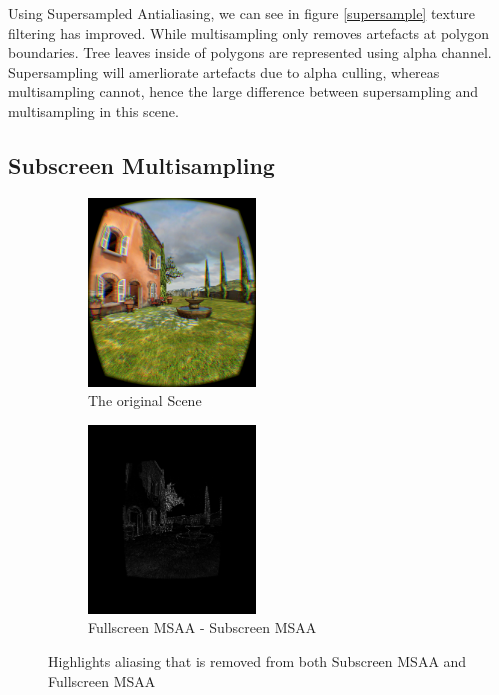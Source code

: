\documentclass[12pt,a4paper,twoside,openright]{report}
\begin{document}
Using Supersampled Antialiasing, we can see in figure \ref{supersample} texture filtering has improved. While multisampling only removes artefacts at polygon boundaries. Tree leaves inside of polygons are represented using alpha channel. Supersampling will amerliorate artefacts due to alpha culling, whereas multisampling cannot, hence the large difference between supersampling and multisampling in this scene.

\clearpage

\subsection{Subscreen Multisampling}

\begin{figure}[tbh]

\begin{subfigure}{0.5\textwidth}
\includegraphics[width=0.9\linewidth, height=5cm]{figs/noantialiasing.png}
\caption{The original Scene}
\label{fig:subim2}
\end{subfigure}
\begin{subfigure}{0.5\textwidth}
\includegraphics[width=0.9\linewidth, height=5cm]{figs/fullscreenminussubscreenmsaa.png} 
\caption{Fullscreen MSAA - Subscreen MSAA}
\label{fig:subim1}
\end{subfigure}
 
\caption{Highlights aliasing that is removed from both Subscreen MSAA and Fullscreen MSAA}
\label{fig:multisample}
\end{figure}
\end{document}
